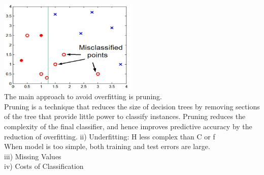 \graphicspath{ {./} }
\includegraphics[width=0.5\textwidth]{Images/A27_img2.png}\\
 
The main approach to avoid overﬁtting is pruning.\\
Pruning is a technique that reduces the size of decision trees by removing sections of the tree that provide little power to classify instances. Pruning reduces the complexity of the ﬁnal classiﬁer, and hence improves predictive accuracy by the reduction of overﬁtting.
ii)	Underfitting: H less complex than C or f \\
When model is too simple, both training and test errors are large.\\
iii)	Missing Values \\
iv)	Costs of Classification
